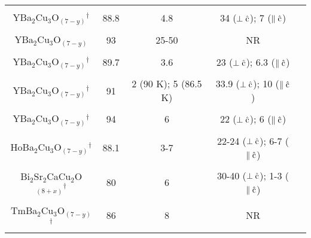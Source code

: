 \begin{table}
\begin{center}
\begin{tabular}{|ccccc|}
& & & & \\
YBa$_2$Cu$_3$O$_{(7-y)}$$^{\dagger}$ & 88.8 & 4.8 &34 ($\rm \perp \hat{c}$); 7 ($\rm \parallel \hat{c}$)  & \cite{worthington87}\\ 
& & & & \\
YBa$_2$Cu$_3$O$_{(7-y)}$ & 93 & 25-50 & NR & \cite{welch87}\\
& & & & \\
YBa$_2$Cu$_3$O$_{(7-y)}$$^{\dagger}$ & 89.7 & 3.6 & 23 ($\rm \perp \hat{c}$); 6.3 ($\rm \parallel \hat{c}$)  & \cite{moodera88}\\ 
& & & & \\
YBa$_2$Cu$_3$O$_{(7-y)}$$^{\dagger}$ & 91 & 2 (90 K); 5 (86.5 K) & 33.9 ($\rm \perp \hat{c}$); 10 ($\rm \parallel \hat{c}$)  & \cite{iye87}\\ 
& & & & \\
YBa$_2$Cu$_3$O$_{(7-y)}$$^{\dagger}$ & 94 & 6 & 22 ($\rm \perp \hat{c}$); 6 ($\rm \parallel \hat{c}$)  & \cite{sakakibara87}\\ 
& & & & \\
HoBa$_2$Cu$_3$O$_{(7-y)}$$^{\dagger}$ & 88.1 & 3-7 & 22-24 ($\rm \perp \hat{c}$); 6-7 ($\rm \parallel \hat{c}$)  & \cite{iye87a}\\ 
& & & & \\
Bi$_2$Sr$_2$CaCu$_2$O$_{(8+x)}$$^{\dagger}$ & 80 & 6 &30-40 ($\rm \perp \hat{c}$); 1-3 ($\rm \parallel \hat{c}$)  & \cite{iye88}\\ 
& & & & \\
TmBa$_2$Cu$_3$O$_{(7-y)}$$^{\dagger}$ & 86 & 8 &NR & \cite{noel87}\\
& & & & \\
\hline
\end{tabular}
\end{center}
\end{table}

